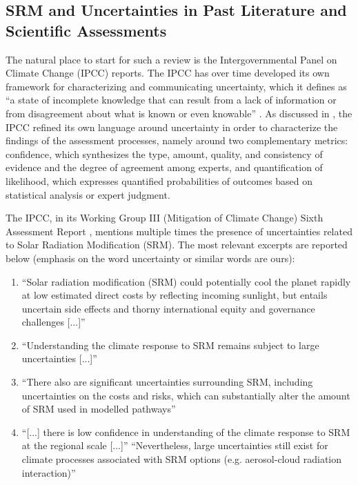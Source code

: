 \documentclass[draft]{agujournal2019}
\begin{document}
\subsection{SRM and Uncertainties in Past Literature and Scientific Assessments}

The natural place to start for such a review is the Intergovernmental Panel on Climate Change (IPCC) reports. The IPCC has over time developed its own framework for characterizing and communicating uncertainty, which it defines as ``a state of incomplete knowledge that can result from a lack of information or from disagreement about what is known or even knowable'' \cite{IPCC_2013_WGI_SPM}. As discussed in , the IPCC refined its own language around uncertainty in order to characterize the findings of the assessment processes, namely around two complementary metrics: confidence, which synthesizes the type, amount, quality, and consistency of evidence and the degree of agreement among experts, and quantification of likelihood, which expresses quantified probabilities of outcomes based on statistical analysis or expert judgment.

The IPCC, in its Working Group III (Mitigation of Climate Change) Sixth Assessment Report \cite{IPCC_2022_WGIII}, mentions multiple times the presence of uncertainties related to Solar Radiation Modification (SRM). The most relevant excerpts are reported below (emphasis on the word uncertainty or similar words are ours):

\begin{enumerate}
    \item ``Solar radiation modification (SRM) could potentially cool the planet rapidly at low estimated direct costs by reflecting incoming sunlight, but entails uncertain side effects and thorny international equity and governance challenges [...]''
    \item ``Understanding the climate response to SRM remains subject to large uncertainties [...]''
    \item ``There also are significant uncertainties surrounding SRM, including uncertainties on the costs and risks, which can substantially alter the amount of SRM used in modelled pathways''
    \item ``[...] there is low confidence in understanding of the climate response to SRM at the regional scale [...]'' ``Nevertheless, large uncertainties still exist for climate processes associated with SRM options (e.g. aerosol-cloud radiation interaction)''
\end{enumerate}
\end{document}
